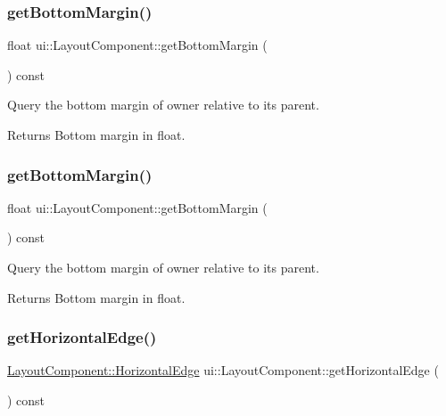 \subsubsection{\texorpdfstring{get\+Bottom\+Margin()}{getBottomMargin()}\hspace{0.1cm}{\footnotesize\ttfamily [1/2]}}
{\footnotesize\ttfamily float ui\+::\+Layout\+Component\+::get\+Bottom\+Margin (\begin{DoxyParamCaption}{ }\end{DoxyParamCaption}) const}

Query the bottom margin of owner relative to its parent. \begin{DoxyReturn}{Returns}
Bottom margin in float. 
\end{DoxyReturn}
\mbox{\label{classui_1_1LayoutComponent_a264d31acf95b9361026acbd2ebf54e12}} 
\subsubsection{\texorpdfstring{get\+Bottom\+Margin()}{getBottomMargin()}\hspace{0.1cm}{\footnotesize\ttfamily [2/2]}}
{\footnotesize\ttfamily float ui\+::\+Layout\+Component\+::get\+Bottom\+Margin (\begin{DoxyParamCaption}{ }\end{DoxyParamCaption}) const}

Query the bottom margin of owner relative to its parent. \begin{DoxyReturn}{Returns}
Bottom margin in float. 
\end{DoxyReturn}
\mbox{\label{classui_1_1LayoutComponent_a131733aa3e67cb8dd068cee9b4a6b40d}} 
\subsubsection{\texorpdfstring{get\+Horizontal\+Edge()}{getHorizontalEdge()}\hspace{0.1cm}{\footnotesize\ttfamily [1/2]}}
{\footnotesize\ttfamily \hyperlink{classui_1_1LayoutComponent_aaa61687a8a4e98f525413e1f0cfacf18}{Layout\+Component\+::\+Horizontal\+Edge} ui\+::\+Layout\+Component\+::get\+Horizontal\+Edge (\begin{DoxyParamCaption}{ }\end{DoxyParamCaption}) const}

